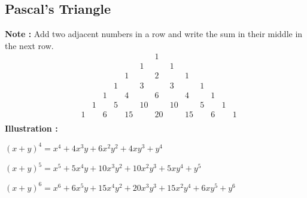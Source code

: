\documentclass{article}
\begin{document}
\subsection{Pascal's Triangle}
\hspace*{10mm}\textbf{Note :} Add two adjacent numbers in a row and write the sum in their middle in the next row.
\[
\begin{array}{ccccccccccccccccccc}
&&&&&&& 1 \\
&&&&&& 1 && 1 \\
&&&&& 1 && 2 && 1 \\
&&&& 1 && 3 && 3 && 1 \\
&&& 1 && 4 && 6 && 4 && 1 \\
&& 1 && 5 && 10 && 10 && 5 && 1 \\
& 1 && 6 && 15 && 20 && 15 && 6 && 1 \\
\end{array}
\]
\hspace*{10mm}\textbf{Illustration :}
\begin{center}
	$(x+y)^{4}=x^{4}+4x^{3}y+6x^{2}y^{2}+4xy^{3}+y^{4}$
	
	$(x+y)^{5}=x^{5}+5x^{4}y+10x^{3}y^{2}+10x^{2}y^{3}+5xy^{4}+y^{5}$
	
	$(x+y)^{6}=x^{6}+6x^{5}y+15x^{4}y^{2}+20x^{3}y^{3}+15x^{2}y^{4}+6xy^{5}+y^{6}$
\end{center}
\pagebreak
\end{document}
